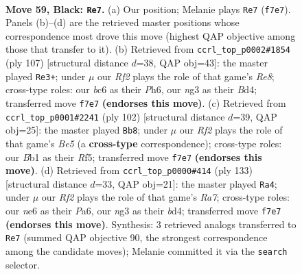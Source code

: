 \documentclass[11pt]{article}
\begin{document}
\clearpage

\begin{figure}[p]\centering
\begin{subfigure}{0.46\textwidth}\centering
\resizebox{\linewidth}{!}{%
\newchessgame
\chessboard[
  setfen={8/k4r2/2B1N3/2R2p2/1P6/2K3N1/6P1/1b6 b - - 15 59},
  showmover=false,
  pgfstyle=straightmove, color=movearrow, markmove={f7-e7}
]}
\caption{}
\end{subfigure}\hfill
\begin{subfigure}{0.46\textwidth}\centering
\resizebox{\linewidth}{!}{%
\newchessgame
\chessboard[
  setfen={8/8/4k2p/2p5/N2b4/P5KP/1PR5/4r3 b - - 0 54},
  showmover=false,
  pgfstyle=straightmove, color=movearrow, markmove={e1-e3}
]}
\caption{}
\end{subfigure}
\\[4pt]
\begin{subfigure}{0.46\textwidth}\centering
\resizebox{\linewidth}{!}{%
\newchessgame
\chessboard[
  setfen={4k3/p7/1p6/2nNBR2/8/1r4P1/6K1/2b5 w - - 1 52},
  showmover=false,
  pgfstyle=straightmove, color=movearrow, markmove={e5-b8}
]}
\caption{}
\end{subfigure}\hfill
\begin{subfigure}{0.46\textwidth}\centering
\resizebox{\linewidth}{!}{%
\newchessgame
\chessboard[
  setfen={8/5k2/p4p2/8/3BK2R/7P/r2b1P2/8 b - - 2 67},
  showmover=false,
  pgfstyle=straightmove, color=movearrow, markmove={a2-a4}
]}
\caption{}
\end{subfigure}
\caption{\textbf{Move 59, Black: \texttt{Re7}.} (a) Our position; Melanie plays \texttt{Re7} (\texttt{f7e7}). Panels (b)--(d) are the retrieved master positions whose correspondence most drove this move (highest QAP objective among those that transfer to it). (b) Retrieved from \texttt{ccrl\_top\_p0002\#1854} (ply 107) [structural distance $d$=38, QAP obj=43]: the master played \texttt{Re3+}; under $\mu$ our \emph{Rf2} plays the role of that game's \emph{Re8}; cross-type roles: our \emph{b}c6 as their \emph{P}h6, our \emph{n}g3 as their \emph{B}d4; transferred move \texttt{f7e7} \textbf{(endorses this move)}. (c) Retrieved from \texttt{ccrl\_top\_p0001\#2241} (ply 102) [structural distance $d$=39, QAP obj=25]: the master played \texttt{Bb8}; under $\mu$ our \emph{Rf2} plays the role of that game's \emph{Be5} (a \textbf{cross-type} correspondence); cross-type roles: our \emph{B}b1 as their \emph{R}f5; transferred move \texttt{f7e7} \textbf{(endorses this move)}. (d) Retrieved from \texttt{ccrl\_top\_p0000\#414} (ply 133) [structural distance $d$=33, QAP obj=21]: the master played \texttt{Ra4}; under $\mu$ our \emph{Rf2} plays the role of that game's \emph{Ra7}; cross-type roles: our \emph{n}e6 as their \emph{P}a6, our \emph{n}g3 as their \emph{b}d4; transferred move \texttt{f7e7} \textbf{(endorses this move)}. Synthesis: 3 retrieved analogs transferred to \texttt{Re7} (summed QAP objective 90, the strongest correspondence among the candidate moves); Melanie committed it via the \texttt{search} selector.}
\label{fig:thought-m117}
\end{figure}
\end{document}
